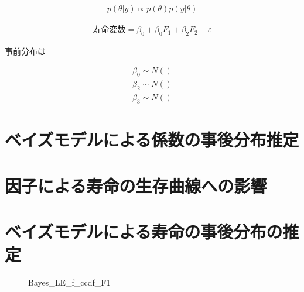 \documentclass[a4j,11pt,mc]{jreport}
\begin{document}
\begin{eqnarray}
   p(\theta|y) \propto p(\theta)p(y|\theta)
\end{eqnarray}



\begin{eqnarray}
\mbox{寿命変数}=\beta_0 +\beta_0F_1 + \beta_2 F_2+\varepsilon
\end{eqnarray}

事前分布は

\begin{eqnarray}
\beta_0 \sim N()\\
\beta_2 \sim N()\\
\beta_3 \sim N()
\end{eqnarray}





\section{ベイズモデルによる係数の事後分布推定}




\section{因子による寿命の生存曲線への影響}

\section{ベイズモデルによる寿命の事後分布の推定}
	\begin{figure}[H]
		\begin{center}
				\caption{Bayes\_LE\_f\_ccdf\_F1}
		\end{center}
	\end{figure}
\end{document}
